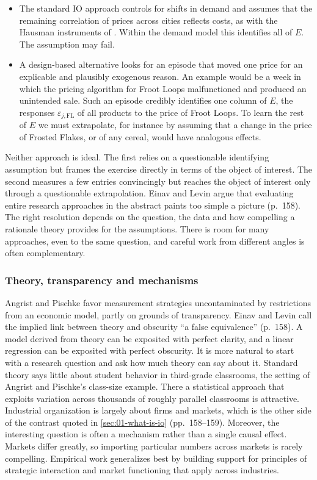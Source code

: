 \begin{itemize}
  \item The standard IO approach controls for shifts in demand and assumes that the remaining correlation of
        prices across cities reflects costs, as with the Hausman instruments of \citet{Nevo2001}. Within the
        demand model this identifies all of $E$. The assumption may fail.
  \item A design-based alternative looks for an episode that moved one price for an explicable and plausibly
        exogenous reason. An example would be a week in which the pricing algorithm for Froot Loops
        malfunctioned and produced an unintended sale. Such an episode credibly identifies one column of
        $E$, the responses $\varepsilon_{j,\mathrm{FL}}$ of all products to the price of Froot Loops. To learn
        the rest of $E$ we must extrapolate, for instance by assuming that a change in the price of Frosted
        Flakes, or of any cereal, would have analogous effects.
\end{itemize}

Neither approach is ideal. The first relies on a questionable identifying assumption but frames the exercise
directly in terms of the object of interest. The second measures a few entries convincingly but reaches the
object of interest only through a questionable extrapolation. Einav and Levin argue that evaluating entire
research approaches in the abstract paints too simple a picture (p.~158). The right resolution depends on the
question, the data and how compelling a rationale theory provides for the assumptions. There is room for many
approaches, even to the same question, and careful work from different angles is often complementary.

\subsubsection{Theory, transparency and mechanisms}

Angrist and Pischke favor measurement strategies uncontaminated by restrictions from an economic model, partly
on grounds of transparency. Einav and Levin call the implied link between theory and obscurity ``a false
equivalence'' (p.~158). A model derived from theory can be exposited with perfect clarity, and a linear
regression can be exposited with perfect obscurity. It is more natural to start with a research question and
ask how much theory can say about it. Standard theory says little about student behavior in third-grade
classrooms, the setting of Angrist and Pischke's class-size example. There a statistical approach that exploits
variation across thousands of roughly parallel classrooms is attractive. Industrial organization is largely
about firms and markets, which is the other side of the contrast quoted in \cref{sec:01-what-is-io}
(pp.~158--159). Moreover, the interesting question is often a mechanism rather than a single
causal effect. Markets differ greatly, so importing particular numbers across markets is rarely compelling.
Empirical work generalizes best by building support for principles of strategic interaction and market
functioning that apply across industries.

